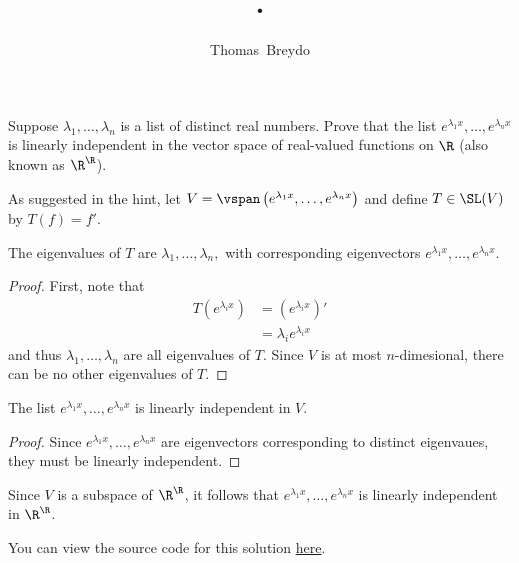 \documentclass{amsart}
\title{\pagenum.\probnum}
\author{Thomas\ Breydo}
\newcommand{\pagenum}{142}
\newcommand{\probnum}{32}
\begin{document}
\maketitle

\begin{problem*}
Suppose $\lambda_1,\dots,\lambda_n$ is a list of distinct real numbers.
Prove that the list $e^{\lambda_1 x},\ldots,e^{\lambda_n x}$
is linearly independent in the vector space of real-valued
functions on $\R$ (also known as $\R^\R$).
\end{problem*}

\vspace{0.5in}

As suggested in the hint, let
$V=\vspan\left(e^{\lambda_1 x},\ldots,e^{\lambda_n x}\right)$
and define $T\in\SL(V)$ by $T(f)=f'.$

\begin{claim*}
The eigenvalues of $T$ are $\lambda_1,\ldots,\lambda_n,$ with
corresponding eigenvectors $e^{\lambda_1 x},\ldots,e^{\lambda_n x}.$
\end{claim*}
\begin{proof}
First, note that
\begin{align*}
    T\left(e^{\lambda_i x}\right)
    &= \left(e^{\lambda_i x}\right)' \\
    &=\lambda_i e^{\lambda_i x}
\end{align*}
and thus $\lambda_1,\ldots,\lambda_n$ are all eigenvalues of $T.$
Since $V$ is at most $n$-dimesional, there can be no other
eigenvalues of $T.$
\end{proof}

\begin{claim*}
The list $e^{\lambda_1 x},\ldots,e^{\lambda_n x}$ is linearly
independent in $V.$
\end{claim*}
\begin{proof}
Since $e^{\lambda_1x},\ldots,e^{\lambda_nx}$ are eigenvectors corresponding
to distinct eigenvaues, they must be linearly independent.
\end{proof}

Since $V$ is a subspace of $\R^\R$,
it follows that $e^{\lambda_1 x},\ldots,e^{\lambda_n x}$
is linearly independent in $\R^\R$.

\vspace{0.5in}

\begin{note*}
You can view the source code for this solution
\href{https://github.com/thomasbreydo/linalg/blob/main/\pagenum_\probnum_Thomas_Breydo.tex}
{here}.
\end{note*}
\end{document}
